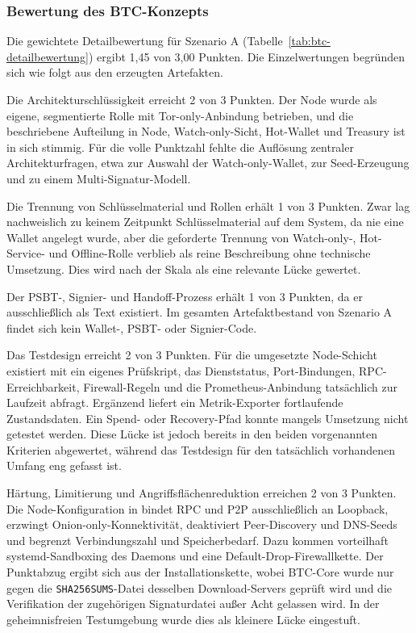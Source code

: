\subsubsection{Bewertung des \ac{BTC}-Konzepts}

Die gewichtete Detailbewertung für Szenario A (Tabelle~\ref{tab:btc-detailbewertung}) ergibt 1{,}45 von 3{,}00 Punkten. Die Einzelwertungen begründen sich wie folgt aus den erzeugten Artefakten.

Die Architekturschlüssigkeit erreicht 2 von 3 Punkten. Der Node wurde als eigene, segmentierte Rolle mit Tor-only-Anbindung betrieben, und die beschriebene Aufteilung in Node, Watch-only-Sicht, Hot-Wallet und Treasury ist in sich stimmig. Für die volle Punktzahl fehlte die Auflösung zentraler Architekturfragen, etwa zur Auswahl der Watch-only-Wallet, zur Seed-Erzeugung und zu einem Multi-Signatur-Modell.

Die Trennung von Schlüsselmaterial und Rollen erhält 1 von 3 Punkten. Zwar lag nachweislich zu keinem Zeitpunkt Schlüsselmaterial auf dem System, da nie eine Wallet angelegt wurde, aber die geforderte Trennung von Watch-only-, Hot-Service- und Offline-Rolle verblieb als reine Beschreibung ohne technische Umsetzung. Dies wird nach der Skala als eine relevante Lücke gewertet.

Der \ac{PSBT}-, Signier- und Handoff-Prozess erhält 1 von 3 Punkten, da er ausschließlich als Text existiert. Im gesamten Artefaktbestand von Szenario A findet sich kein Wallet-, \ac{PSBT}- oder Signier-Code.

Das Testdesign erreicht 2 von 3 Punkten. Für die umgesetzte Node-Schicht existiert mit  ein eigenes Prüfskript, das Dienststatus, Port-Bindungen, \ac{RPC}-Erreichbarkeit, Firewall-Regeln und die Prometheus-Anbindung tatsächlich zur Laufzeit abfragt. Ergänzend liefert ein Metrik-Exporter fortlaufende Zustandsdaten. 
Ein Spend- oder Recovery-Pfad konnte mangels Umsetzung nicht getestet werden. Diese Lücke ist jedoch bereits in den beiden vorgenannten Kriterien abgewertet, während das Testdesign für den tatsächlich vorhandenen Umfang eng gefasst ist.

Härtung, Limitierung und Angriffsflächenreduktion erreichen 2 von 3 Punkten. Die Node-Konfiguration in  bindet \ac{RPC} und \ac{P2P} ausschließlich an Loopback, erzwingt Onion-only-Konnektivität, deaktiviert Peer-Discovery und \ac{DNS}-Seeds und begrenzt Verbindungszahl und Speicherbedarf. Dazu kommen vorteilhaft systemd-Sandboxing des Daemons und eine Default-Drop-Firewallkette. 
Der Punktabzug ergibt sich aus der Installationskette, wobei \ac{BTC}-Core wurde nur gegen die \texttt{SHA256SUMS}-Datei desselben Download-Servers geprüft wird und die Verifikation der zugehörigen Signaturdatei außer Acht gelassen wird. In der geheimnisfreien Testumgebung wurde dies als kleinere Lücke eingestuft.

